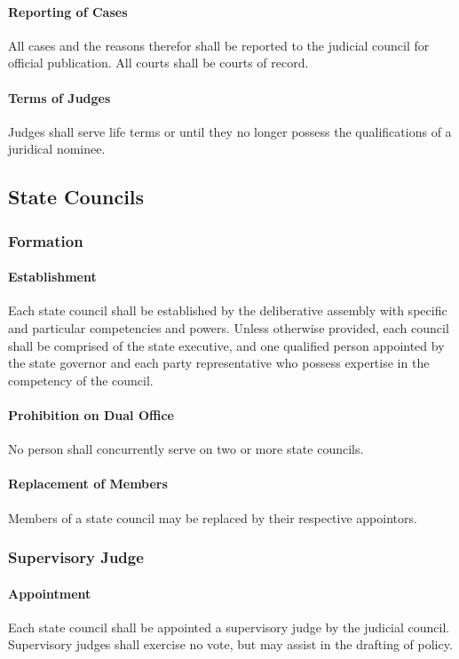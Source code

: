 \documentclass{article}
\begin{document}
\paragraph{Reporting of Cases}
All cases and the reasons therefor shall be reported to the judicial council for official publication. All courts shall be courts of record.
\paragraph{Terms of Judges}
Judges shall serve life terms or until they no longer possess the qualifications of a juridical nominee.
\subsection{State Councils}
\subsubsection{Formation}
\paragraph{Establishment}
Each state council shall be established by the deliberative assembly with specific and particular competencies and powers. Unless otherwise provided, each council shall be comprised of the state executive, and one qualified person appointed by the state governor and each party representative who possess expertise in the competency of the council. 
\paragraph{Prohibition on Dual Office}
No person shall concurrently serve on two or more state councils.
\paragraph{Replacement of Members}
Members of a state council may be replaced by their respective appointors.
\subsubsection{Supervisory Judge}
\paragraph{Appointment}
Each state council shall be appointed a supervisory judge by the judicial council. Supervisory judges shall exercise no vote, but may assist in the drafting of policy.
\end{document}
